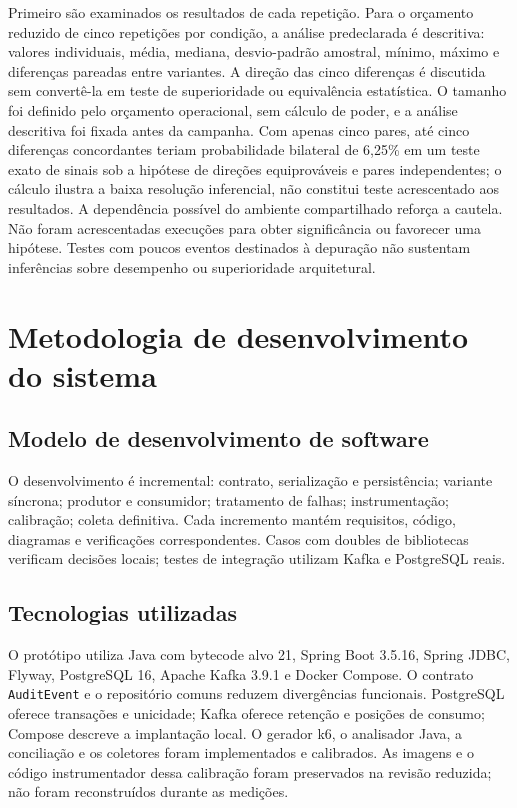 Primeiro são examinados os resultados de cada repetição. Para o orçamento reduzido de cinco repetições por condição, a análise predeclarada é descritiva: valores individuais, média, mediana, desvio-padrão amostral, mínimo, máximo e diferenças pareadas entre variantes. A direção das cinco diferenças é discutida sem convertê-la em teste de superioridade ou equivalência estatística. O tamanho foi definido pelo orçamento operacional, sem cálculo de poder, e a análise descritiva foi fixada antes da campanha. Com apenas cinco pares, até cinco diferenças concordantes teriam probabilidade bilateral de 6,25\% em um teste exato de sinais sob a hipótese de direções equiprováveis e pares independentes; o cálculo ilustra a baixa resolução inferencial, não constitui teste acrescentado aos resultados. A dependência possível do ambiente compartilhado reforça a cautela. Não foram acrescentadas execuções para obter significância ou favorecer uma hipótese. Testes com poucos eventos destinados à depuração não sustentam inferências sobre desempenho ou superioridade arquitetural.

\section{Metodologia de desenvolvimento do sistema}

\subsection{Modelo de desenvolvimento de software}
O desenvolvimento é incremental: contrato, serialização e persistência; variante síncrona; produtor e consumidor; tratamento de falhas; instrumentação; calibração; coleta definitiva. Cada incremento mantém requisitos, código, diagramas e verificações correspondentes. Casos com doubles de bibliotecas verificam decisões locais; testes de integração utilizam Kafka e PostgreSQL reais.

\subsection{Tecnologias utilizadas}
O protótipo utiliza Java com bytecode alvo 21, Spring Boot 3.5.16, Spring JDBC, Flyway, PostgreSQL 16, Apache Kafka 3.9.1 e Docker Compose. O contrato \texttt{AuditEvent} e o repositório comuns reduzem divergências funcionais. PostgreSQL oferece transações e unicidade; Kafka oferece retenção e posições de consumo; Compose descreve a implantação local. O gerador k6, o analisador Java, a conciliação e os coletores foram implementados e calibrados. As imagens e o código instrumentador dessa calibração foram preservados na revisão reduzida; não foram reconstruídos durante as medições.

